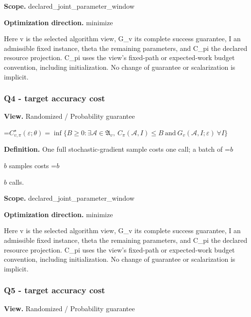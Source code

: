 \documentclass[10pt,a4paper]{article}
\newcommand{\AtlasMath}[1]{\par\begingroup\centering\setbox0=\hbox{$\displaystyle #1$}\ifdim\wd0>1.4\linewidth\typeout{ATLAS WIDE FORMULA: \the\wd0}\fi\ifdim\wd0>\linewidth\resizebox{\linewidth}{!}{\box0}\else\box0\fi\par\endgroup}
\newcommand{\AtlasInlineMath}[1]{\begingroup\setbox0=\hbox{$#1$}\ifdim\wd0>.4\linewidth\endgroup\AtlasMath{#1}\else\endgroup$#1$\fi}
\begin{document}
\textbf{Scope.} declared\_joint\_parameter\_window



\textbf{Optimization direction.} minimize



Here v is the selected algorithm view, G\_v its complete success guarantee, I an admissible fixed instance, theta the remaining parameters, and C\_pi the declared resource projection. C\_pi uses the view's fixed-path or expected-work budget convention, including initialization. No change of guarantee or scalarization is implicit.



\subsubsection{Q4 - target accuracy cost}


\textbf{View.} Randomized / Probability guarantee



\AtlasMath{C^\star_{v,\pi}(\varepsilon;\theta)=\inf\{B\ge0:\exists\mathcal A\in\mathfrak A_v,\ C_\pi(\mathcal A,I)\le B\ \text{and}\ G_v(\mathcal A,I;\varepsilon)\ \forall I\}}


\textbf{Definition.} One full stochastic-gradient sample costs one call; a batch of \AtlasInlineMath{b} samples costs \AtlasInlineMath{b} calls.



\textbf{Scope.} declared\_joint\_parameter\_window



\textbf{Optimization direction.} minimize



Here v is the selected algorithm view, G\_v its complete success guarantee, I an admissible fixed instance, theta the remaining parameters, and C\_pi the declared resource projection. C\_pi uses the view's fixed-path or expected-work budget convention, including initialization. No change of guarantee or scalarization is implicit.



\subsubsection{Q5 - target accuracy cost}


\textbf{View.} Randomized / Probability guarantee
\end{document}
